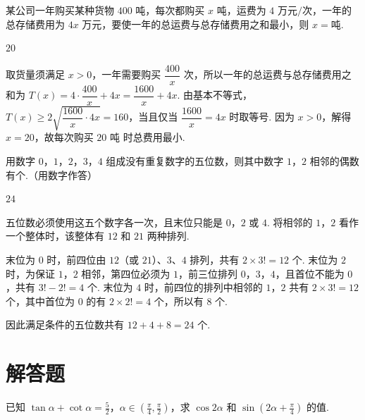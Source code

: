 \begin{problem}
某公司一年购买某种货物 \(400\text{ 吨}\)，每次都购买 \(x\text{ 吨}\)，运费为 \(4\text{ 万元/次}\)，一年的总存储费用为 \(4x\text{ 万元}\)，要使一年的总运费与总存储费用之和最小，则 \(x=\)\fillinblank{}\(\text{吨}\).
\end{problem}

\begin{answer}
\(20\)
\end{answer}

\begin{solution}
取货量须满足 \(x>0\)，一年需要购买 \(\dfrac{400}{x}\) 次，所以一年的总运费与总存储费用之和为 \(T(x)=4\cdot\dfrac{400}{x}+4x=\dfrac{1600}{x}+4x\). 由基本不等式，\(T(x)\geqslant2\sqrt{\dfrac{1600}{x}\cdot4x}=160\)，当且仅当 \(\dfrac{1600}{x}=4x\) 时取等号. 因为 \(x>0\)，解得 \(x=20\)，故每次购买 \(20\text{ 吨}\) 时总费用最小.
\end{solution}

\begin{problem}
用数字 \(0\)，\(1\)，\(2\)，\(3\)，\(4\) 组成没有重复数字的五位数，则其中数字 \(1\)，\(2\) 相邻的偶数有\fillinblank{}\(\text{个}\).（用数字作答）
\end{problem}

\begin{answer}
\(24\)
\end{answer}

\begin{solution}
五位数必须使用这五个数字各一次，且末位只能是 \(0\)，\(2\) 或 \(4\). 将相邻的 \(1\)，\(2\) 看作一个整体时，该整体有 \(12\) 和 \(21\) 两种排列.

末位为 \(0\) 时，前四位由 \(12\)（或 \(21\)）、\(3\)、\(4\) 排列，共有 \(2\times3!=12\) 个. 末位为 \(2\) 时，为保证 \(1\)，\(2\) 相邻，第四位必须为 \(1\)，前三位排列 \(0\)，\(3\)，\(4\)，且首位不能为 \(0\)，共有 \(3!-2!=4\) 个. 末位为 \(4\) 时，前四位的排列中相邻的 \(1\)，\(2\) 共有 \(2\times3!=12\) 个，其中首位为 \(0\) 的有 \(2\times2!=4\) 个，所以有 \(8\) 个.

因此满足条件的五位数共有 \(12+4+8=24\) 个.
\end{solution}

\section{解答题}
\begin{problem}
已知 \(\tan \alpha + \cot \alpha = \frac{5}{2}\)，\(\alpha \in \left(\frac{\pi}{4}, \frac{\pi}{2}\right)\)，求 \(\cos 2\alpha\) 和 \(\sin\left(2\alpha + \frac{\pi}{4}\right)\) 的值.
\end{problem}

